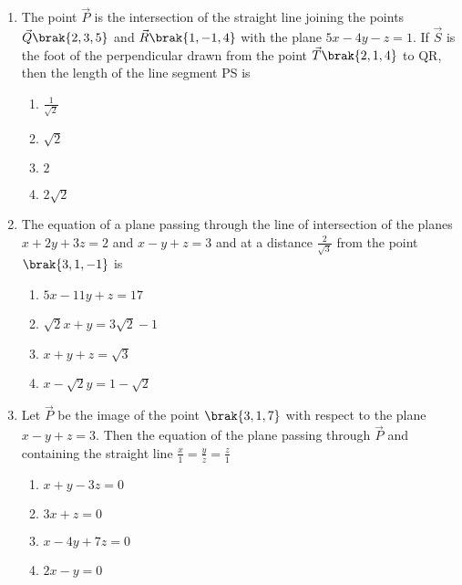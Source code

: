 \begin{enumerate}
\begin{enumerate}
    \end{enumerate}
	 \item %
		 The point $\vec{P}$ is the intersection of the straight line joining the points $\vec{Q}\brak{2,3,5}$ and $\vec{R}\brak{1,-1,4}$ with the plane $5x-4y-z=1$. If $\vec{S}$ is the foot of the perpendicular drawn from the point $\vec{T}\brak{2,1,4}$ to QR, then the length of the line segment PS is \hfill{}\\
\begin{enumerate}
	\item $\frac{1}{\sqrt{2}}$           
	\item $\sqrt{2}$                   
        \item $2$           
	\item $2\sqrt{2}$\\ 
\end{enumerate}
         \item %
		 The equation of a plane passing through the line of intersection of the planes $x+2y+3z=2$ and $x-y+z=3$ and at a distance $\frac{2}{\sqrt{3}}$ from the point $\brak{3,1,-1}$ is \hfill{}\\
\begin{enumerate}
        \item $5x-11y+z=17$           
	\item $\sqrt{2}x+y=3\sqrt{2}-1$                   
	\item $x+y+z=\sqrt{3}$           
	\item $x-\sqrt{2}y=1-\sqrt{2}$\\ 
\end{enumerate}
         \item %
		 Let $\vec{P}$ be the image of the point $\brak{3,1,7}$ with respect to the plane $x-y+z=3$. Then the equation of the plane passing through $\vec{P}$ and containing the straight line $\frac{x}{1}=\frac{y}{z}=\frac{z}{1}$ \hfill{}\\
\begin{enumerate}
        \item $x+y-3z=0$                             
        \item $3x+z=0$                           
        \item $x-4y+7z=0$            
        \item $2x-y=0$\\          
\end{enumerate}


\end{enumerate}
